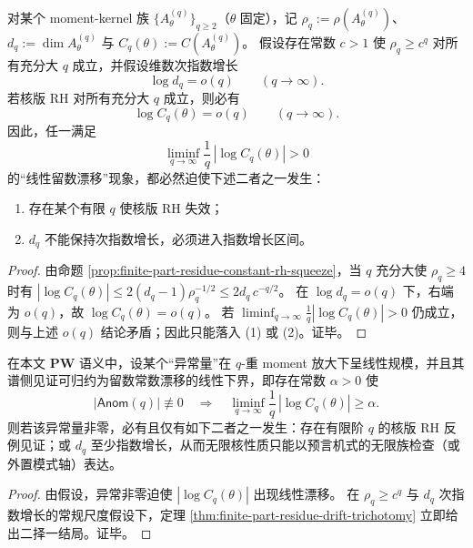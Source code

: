 \begin{theorem}\label{thm:finite-part-residue-drift-trichotomy}
对某个 moment-kernel 族 \(\{A^{(q)}_\theta\}_{q\ge 2}\)（\(\theta\) 固定），记
\(\rho_q:=\rho(A^{(q)}_\theta)\)、\(d_q:=\dim A^{(q)}_\theta\) 与 \(C_q(\theta):=C(A^{(q)}_\theta)\)。
假设存在常数 \(c>1\) 使 \(\rho_q\ge c^q\) 对所有充分大 \(q\) 成立，并假设维数次指数增长
\[
\log d_q=o(q)\qquad(q\to\infty).
\]
若核版 RH 对所有充分大 \(q\) 成立，则必有
\[
\log C_q(\theta)=o(q)\qquad(q\to\infty).
\]
因此，任一满足
\[
\liminf_{q\to\infty}\frac{1}{q}\,|\log C_q(\theta)|>0
\]
的“线性留数漂移”现象，都必然迫使下述二者之一发生：
\begin{enumerate}
  \item 存在某个有限 \(q\) 使核版 RH 失效；
  \item \(d_q\) 不能保持次指数增长，必须进入指数增长区间。
\end{enumerate}
\end{theorem}

\begin{proof}
由命题 \ref{prop:finite-part-residue-constant-rh-squeeze}，当 \(q\) 充分大使 \(\rho_q\ge 4\) 时有
\(
|\log C_q(\theta)|\le 2(d_q-1)\rho_q^{-1/2}
\le 2d_q\,c^{-q/2}
\)。
在 \(\log d_q=o(q)\) 下，右端为 \(o(q)\)，故 \(\log C_q(\theta)=o(q)\)。
若 \(\liminf_{q\to\infty}\frac{1}{q}|\log C_q(\theta)|>0\) 仍成立，则与上述 \(o(q)\) 结论矛盾；因此只能落入 (1) 或 (2)。证毕。
\end{proof}

\begin{corollary}\label{cor:finite-part-oracle-anomaly-equivalence}
在本文 \(\mathbf{PW}\) 语义中，设某个“异常量”在 \(q\)-重 moment 放大下呈线性规模，并且其谱侧见证可归约为留数常数漂移的线性下界，即存在常数 \(\alpha>0\) 使
\[
|\mathsf{Anom}(q)|\not\equiv 0
\quad\Longrightarrow\quad
\liminf_{q\to\infty}\frac{1}{q}\,|\log C_q(\theta)|\ge \alpha.
\]
则若该异常量非零，必有且仅有如下二者之一发生：存在有限阶 \(q\) 的核版 RH 反例见证；或 \(d_q\) 至少指数增长，从而无限核性质只能以预言机式的无限族检查（或外置模式轴）表达。
\end{corollary}

\begin{proof}
由假设，异常非零迫使 \(|\log C_q(\theta)|\) 出现线性漂移。
在 \(\rho_q\ge c^q\) 与 \(d_q\) 次指数增长的常规尺度假设下，定理 \ref{thm:finite-part-residue-drift-trichotomy} 立即给出二择一结局。证毕。
\end{proof}
